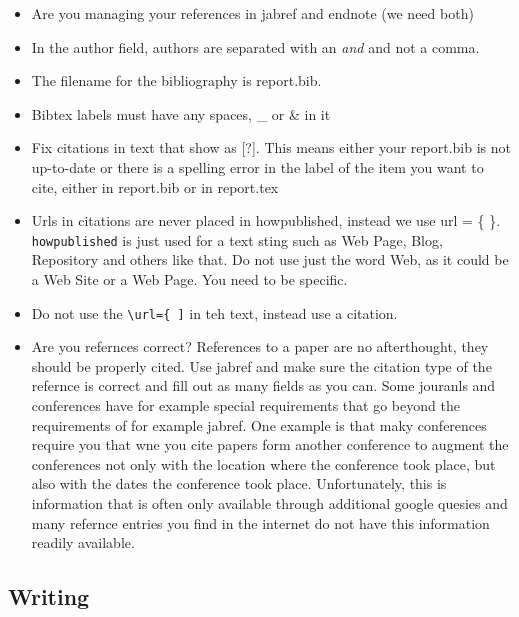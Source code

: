 \begin{itemize}[label=$\Box$]
  \item Are you managing your references in jabref and endnote (we need
    both)
  \item In the author field, authors are separated with an \textit{and}
    and not a comma.
  \item The filename for the bibliography is report.bib.
  \item Bibtex labels must have any spaces, \_ or \& in it
  \item Fix citations in text that show as [?]. This means either your
    report.bib is not up-to-date or there is a spelling error in the
    label of the item you want to cite, either in report.bib or in
    report.tex
  \item Urls in citations are never placed in howpublished, instead we
    use url = \{ \}. \verb|howpublished| is just used for a text sting such
    as Web Page, Blog, Repository and others like that. Do not use
    just the word Web, as it could be a Web Site or a Web Page. You
    need to be specific.
  \item Do not use the \verb|\url={ ]| in teh text, instead use a
      citation.
    \item Are you refernces correct? References to a paper are no
      afterthought, they should be properly cited. Use jabref and make
      sure the citation type of the refernce is correct and fill out
      as many fields as you can. Some jouranls and conferences have
      for example special requirements that go beyond the requirements
      of for example jabref. One example is that maky conferences
      require you that wne you cite papers form another conference to
      augment the conferences not only with the location where the
      conference took place, but also with the dates the conference
      took place. Unfortunately, this is information that is often
      only available through additional google quesies and many
      refernce entries you find in the internet do not have this
      information readily available.
\end{itemize}

\subsection{Writing}

